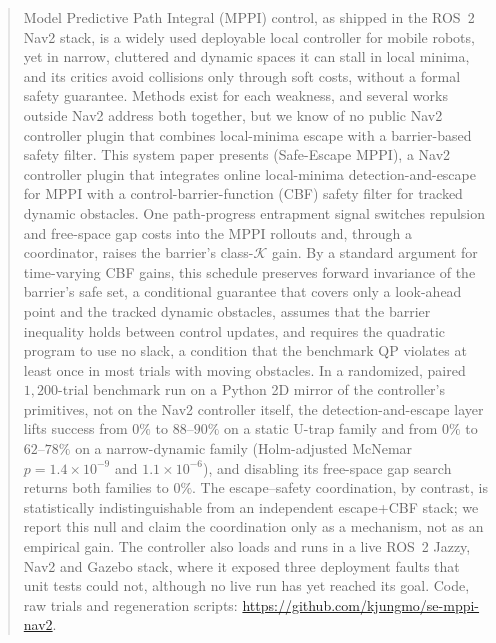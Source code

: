 \begin{abstract}
Model Predictive Path Integral (MPPI) control, as shipped in the ROS~2 Nav2 stack, is a widely used deployable local controller for mobile robots, yet in narrow, cluttered and dynamic spaces it can stall in local minima, and its critics avoid collisions only through soft costs, without a formal safety guarantee. Methods exist for each weakness, and several works outside Nav2 address both together, but we know of no public Nav2 controller plugin that combines local-minima escape with a barrier-based safety filter. This system paper presents \emph{\sname} (Safe-Escape MPPI), a Nav2 controller plugin that integrates online local-minima detection-and-escape for MPPI with a control-barrier-function (CBF) safety filter for tracked dynamic obstacles. One path-progress entrapment signal switches repulsion and free-space gap costs into the MPPI rollouts and, through a coordinator, raises the barrier's class-$\mathcal{K}$ gain. By a standard argument for time-varying CBF gains, this schedule preserves forward invariance of the barrier's safe set, a conditional guarantee that covers only a look-ahead point and the tracked dynamic obstacles, assumes that the barrier inequality holds between control updates, and requires the quadratic program to use no slack, a condition that the benchmark QP violates at least once in most trials with moving obstacles. In a randomized, paired $1{,}200$-trial benchmark run on a Python 2D mirror of the controller's primitives, not on the Nav2 controller itself, the detection-and-escape layer lifts success from $0\%$ to $88$--$90\%$ on a static U-trap family and from $0\%$ to $62$--$78\%$ on a narrow-dynamic family (Holm-adjusted McNemar $p=1.4\times10^{-9}$ and $1.1\times10^{-6}$), and disabling its free-space gap search returns both families to $0\%$. The escape--safety coordination, by contrast, is statistically indistinguishable from an independent escape+CBF stack; we report this null and claim the coordination only as a mechanism, not as an empirical gain. The controller also loads and runs in a live ROS~2 Jazzy, Nav2 and Gazebo stack, where it exposed three deployment faults that unit tests could not, although no live run has yet reached its goal. Code, raw trials and regeneration scripts: \url{https://github.com/kjungmo/se-mppi-nav2}.
\end{abstract}

